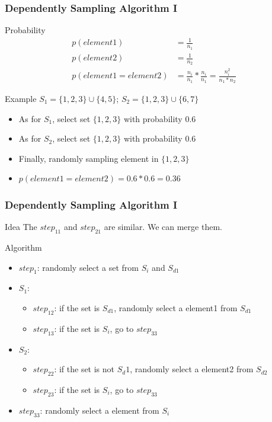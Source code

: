 \documentclass[notheorems, aspectratio=54]{beamer}
\begin{document}
\begin{frame}
    \frametitle{Dependently Sampling Algorithm I}
    \begin{block}{Probability}
        \begin{equation}
            \begin{aligned}
                p(element1) &= \frac{1}{n_1} \\
                p(element2) &= \frac{1}{n_2}\\
                p(element1 = element2) &=  \frac{n_i}{n_1}*\frac{n_i}{n_1} = \frac{n_i^2}{n_1*n_2}
            \end{aligned}
        \end{equation}
    \end{block}
    \begin{block}{Example}
        $S_1 =  \{1,2,3\} \cup \{4,5\}$; $S_2 = \{1,2,3\} \cup \{6,7\}$
        \begin{itemize}
            \item As for $S_1$, select set $\{1,2,3\}$ with probability $0.6$
            \item As for $S_2$, select set $\{1,2,3\}$ with probability $0.6$
            \item Finally, randomly sampling element in $\{1,2,3\}$
            \item $p(element1 = element2) = 0.6*0.6 = 0.36$
        \end{itemize}
    \end{block}
\end{frame}

\begin{frame}
    \frametitle{Dependently Sampling Algorithm I}
    \begin{block}{Idea}
        The $step_{11}$ and $step_{21}$ are similar. We can merge them.
    \end{block}
    \begin{block}{Algorithm}
        \begin{itemize}
            \item $step_{1}$: randomly select a set from $S_i$ and $S_{d1}$
            \item $S_1$:
            \begin{itemize}
                \item $step_{12}$: if the set is $S_{d1}$, randomly select a element1 from $S_{d1}$
                \item $step_{13}$: if the set is $S_i$, go to $step_{33}$
            \end{itemize}
            \item $S_2$:
            \begin{itemize}
                \item $step_{22}$: if the set is not $S_d1$, randomly select a element2 from $S_{d2}$
                \item $step_{23}$: if the set is $S_i$, go to $step_{33}$
            \end{itemize}
            \item $step_{33}$: randomly select a element from $S_i$
        \end{itemize}
    \end{block}
\end{frame}
\end{document}
